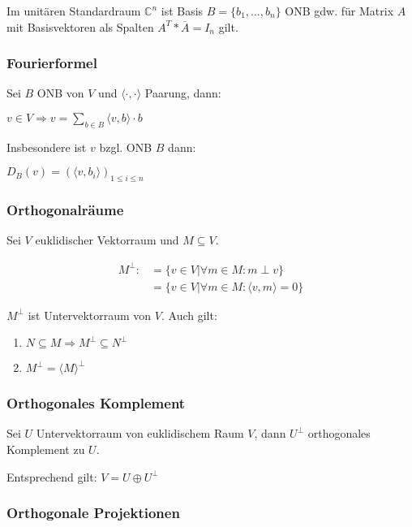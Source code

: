 Im unitären Standardraum $\mathbb{C}^n$ ist Basis $B = \{b_1, ..., b_n\}$ ONB gdw. für Matrix $A$ mit Basisvektoren als Spalten $A^T*\overline A = I_n$ gilt.

\subsubsection*{Fourierformel}

Sei $B$ ONB von $V$ und $\langle \cdot, \cdot \rangle$ Paarung, dann:

$v \in V \Rightarrow v = \sum_{b\in B} \langle v, b \rangle \cdot b$

Insbesondere ist $v$ bzgl. ONB $B$ dann:

$D_B(v) = (\langle v, b_i\rangle)_{1\leq i \leq n}$

\subsubsection*{Orthogonalräume}

Sei $V$ euklidischer Vektorraum und $M \subseteq V$.

\begin{equation*}
	\begin{aligned}
		M^{\perp} :&= \{v \in V | \forall m \in M : m \perp v \} \\
		           &= \{v \in V | \forall m \in M : \langle v, m \rangle = 0\}
	\end{aligned}
\end{equation*}

$M^{\perp}$ ist Untervektorraum von $V$. Auch gilt:

\begin{enumerate}[label=(\alph*)]
	\item $N \subseteq M \Rightarrow M^{\perp} \subseteq N^{\perp}$
	\item $M^{\perp} = \langle M \rangle ^{\perp}$
\end{enumerate}

\subsubsection*{Orthogonales Komplement}

Sei $U$ Untervektorraum von euklidischem Raum $V$, dann $U^\perp$ orthogonales Komplement zu $U$.

Entsprechend gilt: $V = U \oplus U^\perp$

\subsubsection*{Orthogonale Projektionen}

